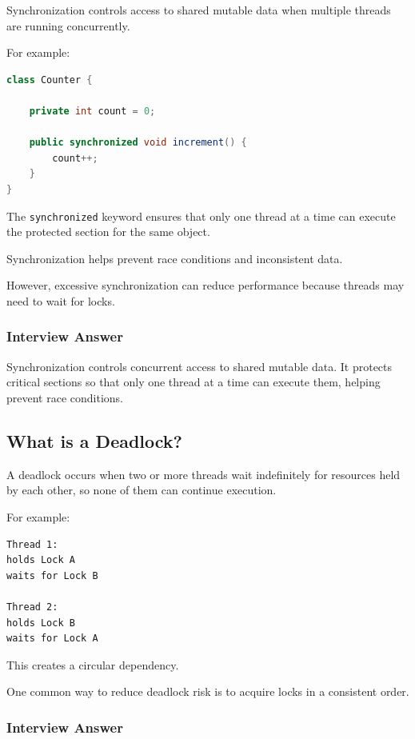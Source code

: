 \documentclass[12pt,a4paper]{article}
\begin{document}
Synchronization controls access to shared mutable data when multiple
threads are running concurrently.

For example:

\begin{lstlisting}[language=Java]
class Counter {

    private int count = 0;

    public synchronized void increment() {
        count++;
    }
}
\end{lstlisting}

The \texttt{synchronized} keyword ensures that only one thread at a time
can execute the protected section for the same object.

Synchronization helps prevent race conditions and inconsistent data.

However, excessive synchronization can reduce performance because threads
may need to wait for locks.

\subsubsection*{Interview Answer}

Synchronization controls concurrent access to shared mutable data. It
protects critical sections so that only one thread at a time can execute
them, helping prevent race conditions.

\subsection{What is a Deadlock?}

A deadlock occurs when two or more threads wait indefinitely for resources
held by each other, so none of them can continue execution.

For example:

\begin{verbatim}
Thread 1:
holds Lock A
waits for Lock B

Thread 2:
holds Lock B
waits for Lock A
\end{verbatim}

This creates a circular dependency.

One common way to reduce deadlock risk is to acquire locks in a consistent
order.

\subsubsection*{Interview Answer}
\end{document}
